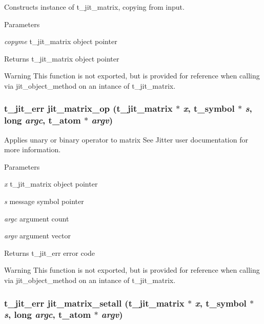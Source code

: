 Constructs instance of t\_\-jit\_\-matrix, copying from input. 
\begin{DoxyParams}{Parameters}
\item[{\em copyme}]t\_\-jit\_\-matrix object pointer\end{DoxyParams}
\begin{DoxyReturn}{Returns}
t\_\-jit\_\-matrix object pointer
\end{DoxyReturn}
\begin{DoxyWarning}{Warning}
This function is not exported, but is provided for reference when calling via jit\_\-object\_\-method on an intance of t\_\-jit\_\-matrix. 
\end{DoxyWarning}
\hypertarget{group__matrixmod_ga5f56aa2c21c39c60e7549beeb86a5120}{
\subsubsection[{jit\_\-matrix\_\-op}]{\setlength{\rightskip}{0pt plus 5cm}t\_\-jit\_\-err jit\_\-matrix\_\-op (t\_\-jit\_\-matrix $\ast$ {\em x}, \/  {\bf t\_\-symbol} $\ast$ {\em s}, \/  long {\em argc}, \/  {\bf t\_\-atom} $\ast$ {\em argv})}}
\label{group__matrixmod_ga5f56aa2c21c39c60e7549beeb86a5120}


Applies unary or binary operator to matrix See Jitter user documentation for more information. 
\begin{DoxyParams}{Parameters}
\item[{\em x}]t\_\-jit\_\-matrix object pointer \item[{\em s}]message symbol pointer \item[{\em argc}]argument count \item[{\em argv}]argument vector\end{DoxyParams}
\begin{DoxyReturn}{Returns}
t\_\-jit\_\-err error code
\end{DoxyReturn}
\begin{DoxyWarning}{Warning}
This function is not exported, but is provided for reference when calling via jit\_\-object\_\-method on an intance of t\_\-jit\_\-matrix. 
\end{DoxyWarning}
\hypertarget{group__matrixmod_ga8082cc74c3e4d5a68167e10d865217e1}{
\subsubsection[{jit\_\-matrix\_\-setall}]{\setlength{\rightskip}{0pt plus 5cm}t\_\-jit\_\-err jit\_\-matrix\_\-setall (t\_\-jit\_\-matrix $\ast$ {\em x}, \/  {\bf t\_\-symbol} $\ast$ {\em s}, \/  long {\em argc}, \/  {\bf t\_\-atom} $\ast$ {\em argv})}}
\label{group__matrixmod_ga8082cc74c3e4d5a68167e10d865217e1}


